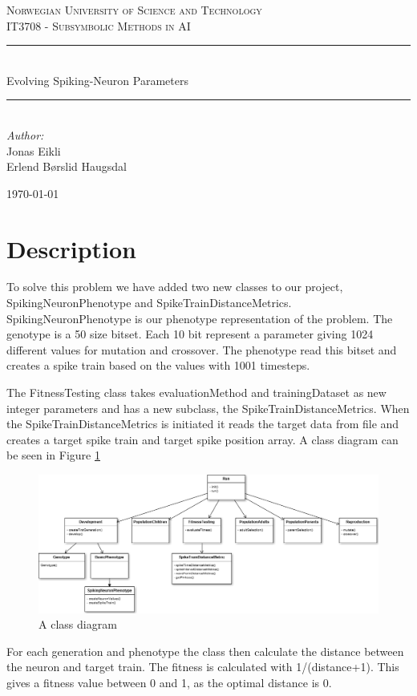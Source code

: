 \documentclass[12pt, a4paper, oneside, titlepage]{article}
\newcommand{\HRule}{\rule{\linewidth}{0.5mm}}
\begin{document}
\begin{titlepage}
\begin{center}
\thispagestyle{empty}

\textsc{\large Norwegian University of Science and Technology} \\
\textsc{IT3708 - Subsymbolic Methods in AI} \\[3cm]
\HRule\\[0.5cm]
{\Huge Evolving Spiking-Neuron Parameters}\\[0.5cm]
\HRule\\[5.5cm]

{\large \emph{Author:}}\\
Jonas Eikli\\
Erlend B\o rslid Haugsdal

\vfill

{\large \today}


\end{center}
\end{titlepage}




\tableofcontents

\newpage
\section{Description}
To solve this problem we have added two new classes to our project, SpikingNeuronPhenotype and SpikeTrainDistanceMetrics. 
SpikingNeuronPhenotype is our phenotype representation of the problem. The genotype is a 50 size bitset. Each 10 bit represent a parameter giving 1024 different values for mutation and crossover.
The phenotype read this bitset and creates a spike train based on the values with 1001 timesteps. 

The FitnessTesting class takes evaluationMethod and trainingDataset as new integer parameters and has a new subclass, the SpikeTrainDistanceMetrics. When the SpikeTrainDistanceMetrics is initiated it reads the target data from file and creates a target spike train and target spike position array. A class diagram can be seen in Figure \ref{classdiagram}

\begin{figure}
	\includegraphics[width=\textwidth]{klassediagram}
	\caption{A class diagram}
	\label{classdiagram}
\end{figure}
For each generation and phenotype the class then calculate the distance between the neuron and target train. The fitness is calculated with 1/(distance+1). This gives a fitness value between 0 and 1, as the optimal distance is 0.
\end{document}

